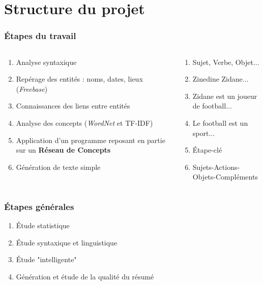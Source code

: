 \documentclass{beamer}
\begin{document}
\section{Structure du projet}


\begin{frame}
\frametitle{Étapes du travail}

\begin{columns}

\begin{column}{6cm}
\begin{enumerate}
 \item Analyse syntaxique
 \item Repérage des entités : noms, dates, lieux (\textit{Freebase})
 \item Connaissances des liens entre entités 
 \item Analyse des concepts (\textit{WordNet} et TF-IDF)
 \item Application d'un programme reposant en partie sur un \textbf{Réseau de Concepts}
 \item Génération de texte simple
\end{enumerate}
\end{column}

\begin{column}{6cm}
\begin{enumerate}
\item Sujet, Verbe, Objet...
\item Zinedine Zidane...
\item Zidane est un joueur de football...
\item Le football est un sport...
\item Étape-clé
\item Sujets-Actions-Objets-Compléments
\end{enumerate}

\end{column}
\end{columns}

\end{frame}

\begin{frame}
\frametitle{Étapes générales}

\begin{enumerate}
\item Étude statistique
\item Étude syntaxique et linguistique
\item Étude "intelligente"
\item Génération et étude de la qualité du résumé
\end{enumerate}

\end{frame}
\end{document}

